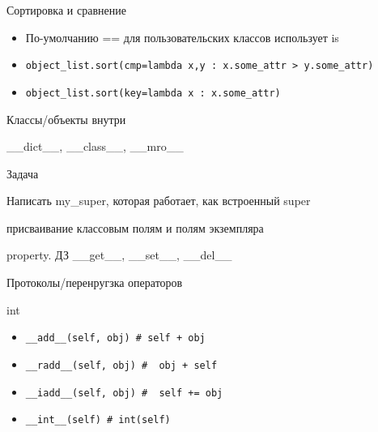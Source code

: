 \documentclass{article}
\begin{document}
\begin{center} Сортировка и сравнение \end{center}
\begin{itemize}
    \item По-умолчанию == для пользовательских классов использует is
    \item \lstinline!object_list.sort(cmp=lambda x,y : x.some_attr > y.some_attr)!
    \item \lstinline!object_list.sort(key=lambda x : x.some_attr)!
\end{itemize}
\newpage

\begin{center}Классы/объекты внутри\end{center}
\_\_dict\_\_, \_\_class\_\_, \_\_mro\_\_
\newpage


\begin{center}Задача\end{center}
Написать my\_super, которая работает, как встроенный super 
\newpage

\begin{center}присваивание классовым полям и полям экземпляра\end{center}
\newpage

property. ДЗ \_\_get\_\_, \_\_set\_\_, \_\_del\_\_
\newpage

\begin{center} Протоколы/перенругзка операторов \end{center}
\begin{center} int \end{center}
\begin{itemize}
    \item \lstinline!__add__(self, obj) # self + obj!
    \item \lstinline!__radd__(self, obj) #  obj + self!
    \item \lstinline!__iadd__(self, obj) #  self += obj!
    \item \lstinline!__int__(self) # int(self)!
\end{itemize}
\newpage
\end{document}
